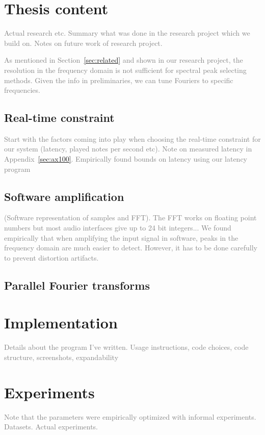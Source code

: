\documentclass[10pt,twocolumn]{article}
\begin{document}
\section{Thesis content}
\textcolor{gray}{Actual research etc. Summary what was done in the research project which we build on. Notes on future work of research project.}

\textcolor{gray}{As mentioned in Section~\ref{sec:related} and shown in our research project, the resolution in the frequency domain is not sufficient for spectral peak selecting methods. Given the info in preliminaries, we can tune Fouriers to specific frequencies.}

\subsection{Real-time constraint}  \label{sec:constraint}
\textcolor{gray}{Start with the factors coming into play when choosing the real-time constraint for our system (latency, played notes per second etc). Note on measured latency in Appendix~\ref{sec:ax100}. Empirically found bounds on latency using our latency program}

\subsection{Software amplification}
\textcolor{gray}{(Software representation of samples and FFT). The FFT works on floating point numbers but most audio interfaces give up to 24 bit integers...}
\textcolor{gray}{We found empirically that when amplifying the input signal in software, peaks in the frequency domain are much easier to detect. However, it has to be done carefully to prevent distortion artifacts.}

\subsection{Parallel Fourier transforms}


\section{Implementation}
\textcolor{gray}{Details about the program I've written. Usage instructions, code choices, code structure, screenshots, expandability}



\section{Experiments}  \label{sec:exp}
\textcolor{gray}{Note that the parameters were empirically optimized with informal experiments. Datasets. Actual experiments.}
\end{document}
